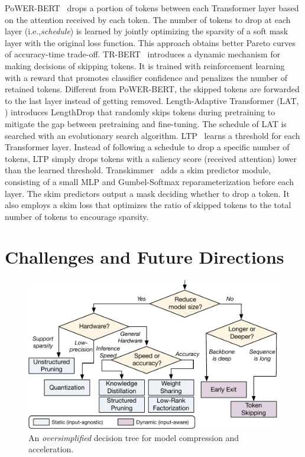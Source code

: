 \documentclass[letterpaper]{article}
\newcommand{\ie}{i.e.,\xspace}
\begin{document}
PoWER-BERT~\citep{powerbert} drops a portion of tokens between each Transformer layer based on the attention received by each token. The number of tokens to drop at each layer (\ie \textit{schedule}) is learned by jointly optimizing the sparsity of a soft mask layer with the original loss function. This approach obtains better Pareto curves of accuracy-time trade-off. TR-BERT~\citep{trbert} introduces a dynamic mechanism for making decisions of skipping tokens. It is trained with reinforcement learning with a reward that promotes classifier confidence and penalizes the number of retained tokens. Different from PoWER-BERT, the skipped tokens are forwarded to the last layer instead of getting removed. Length-Adaptive Transformer (LAT, \citealp{lat}) introduces LengthDrop that randomly skips tokens during pretraining to mitigate the gap between pretraining and fine-tuning. The schedule of LAT is searched with an evolutionary search algorithm. LTP~\citep{ltp} learns a threshold for each Transformer layer. Instead of following a schedule to drop a specific number of tokens, LTP simply drops tokens with a saliency score (received attention) lower than the learned threshold. Transkimmer~\citep{transkimmer} adds a skim predictor module, consisting of a small MLP and Gumbel-Softmax reparameterization before each layer. The skim predictors output a mask deciding whether to drop a token. It also employs a skim loss that optimizes the ratio of skipped tokens to the total number of tokens to encourage sparsity.

\section{Challenges and Future Directions}
\begin{figure}[t]
\centering
  \includegraphics[width=\linewidth]{decision_tree.pdf}
  \caption{An \textit{oversimplified} decision tree for model compression and acceleration.}
  \label{fig:decision}
\end{figure}
\end{document}

